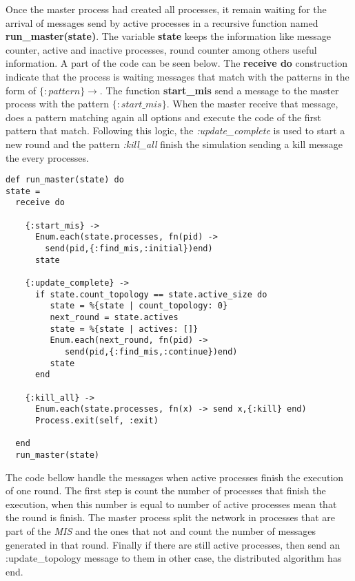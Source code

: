 Once the master process had created all processes, it remain waiting for the arrival of messages send by active processes in a recursive function named \textbf{run\_master(state)}. The variable \textbf{state} keeps the information like message counter, active and inactive processes, round counter among others useful information. A part of the code can be seen below. The \textbf{receive do} construction indicate that the process is waiting messages that match with the patterns in the form of $\{:pattern\} \rightarrow$. The function \textbf{start\_mis} send a message to the master process with the pattern $\{:start\_mis\}$. When the master receive that message, does a pattern matching again all options and execute the code of the first pattern that match.  Following this logic, the \textit{:update\_complete} is used to start a new round and the pattern \textit{:kill\_all} finish the simulation sending a kill message the every processes. 


\begin{lstlisting}[frame=single]
def run_master(state) do
state =
  receive do

    {:start_mis} ->
      Enum.each(state.processes, fn(pid) ->
        send(pid,{:find_mis,:initial})end)
      state

    {:update_complete} ->
      if state.count_topology == state.active_size do
         state = %{state | count_topology: 0}
         next_round = state.actives
         state = %{state | actives: []}
         Enum.each(next_round, fn(pid) -> 
            send(pid,{:find_mis,:continue})end)
         state
      end
        
    {:kill_all} ->
      Enum.each(state.processes, fn(x) -> send x,{:kill} end)
      Process.exit(self, :exit)
      
  end
  run_master(state)

\end{lstlisting}

The code bellow handle the messages when active processes finish the execution of one round. The first step is count the number of processes that finish the execution, when this number is equal to number of active processes mean that the round is finish. The master process split the network in processes that are part of the \textit{MIS} and the ones that not and count the number of messages generated in that round. Finally if there are still active processes, then send an :update\_topology message to them in other case, the distributed algorithm has end.    
 
